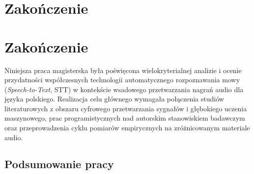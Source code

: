 \section*{Zakończenie}\section*{Zakończenie}
\label{sec:zakonczenie}

Niniejsza praca magisterska była poświęcona wielokryterialnej analizie i ocenie przydatności współczesnych technologii automatycznego rozpoznawania mowy (\textit{Speech-to-Text}, STT) w kontekście wsadowego przetwarzania nagrań audio dla języka polskiego. Realizacja celu głównego wymagała połączenia studiów literaturowych z obszaru cyfrowego przetwarzania sygnałów i głębokiego uczenia maszynowego, prac programistycznych nad autorskim stanowiskiem badawczym oraz przeprowadzenia cyklu pomiarów empirycznych na zróżnicowanym materiale audio.

\subsection*{Podsumowanie pracy}

